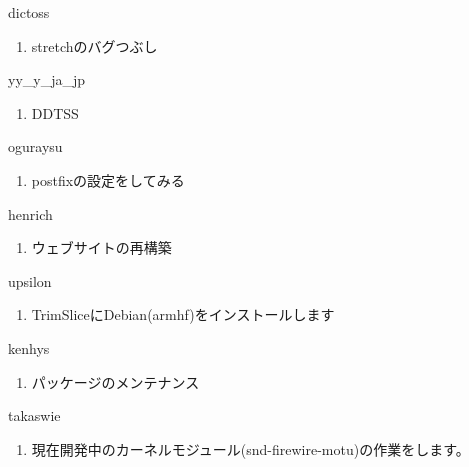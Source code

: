 \begin{prework}{ dictoss }
  \begin{enumerate}
  \item stretchのバグつぶし
  \end{enumerate}
\end{prework}

\begin{prework}{ yy\_y\_ja\_jp }
  \begin{enumerate}
  \item DDTSS
  \end{enumerate}
\end{prework}

\begin{prework}{ oguraysu }
  \begin{enumerate}
  \item postfixの設定をしてみる
  \end{enumerate}
\end{prework}

\begin{prework}{ henrich }
  \begin{enumerate}
  \item ウェブサイトの再構築
  \end{enumerate}
\end{prework}

\begin{prework}{ upsilon }
  \begin{enumerate}
  \item TrimSliceにDebian(armhf)をインストールします
  \end{enumerate}
\end{prework}

\begin{prework}{ kenhys }
  \begin{enumerate}
  \item パッケージのメンテナンス
  \end{enumerate}
\end{prework}

\begin{prework}{ takaswie }
  \begin{enumerate}
  \item 現在開発中のカーネルモジュール(snd-firewire-motu)の作業をします。
  \end{enumerate}
\end{prework}
